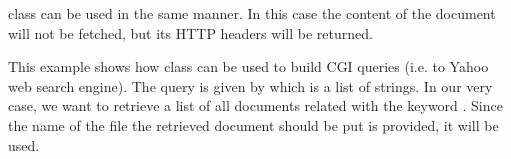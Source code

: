 \documentclass{ozdoc}
\begin{document}
\begin{mozartCODEDISPLAY}
{\mozartSPACE{}\mozartSPACE{}\mozartSPACE{}}\mozartFACETEXT{\mozartNEWLINE
\mozartSPACE{}\mozartSPACE{}\mozartSPACE{}\mozartSPACE{}\mozartSPACE{}\mozartSPACE{}}\mozartFACETEXT{\mozartNEWLINE
\mozartSPACE{}\mozartSPACE{}\mozartSPACE{}\mozartSPACE{}\mozartSPACE{}\mozartSPACE{}}\mozartFACETEXT{\mozartNEWLINE
\mozartSPACE{}\mozartSPACE{}\mozartSPACE{}}\mozartFACETEXT{\mozartNEWLINE
}\end{mozartCODEDISPLAY}


 class can be used in the same manner. In this case the content of the document will not be fetched, but its HTTP headers will be returned.  \mozartEMPTY





This example shows how  class can be used to build CGI queries (i.e. to Yahoo web search engine). The query is given by  which is a list of  strings. In our very case, we want to retrieve a list of all documents related with the keyword . Since the name of the file the retrieved document should be put is provided, it will be used.
\end{document}
